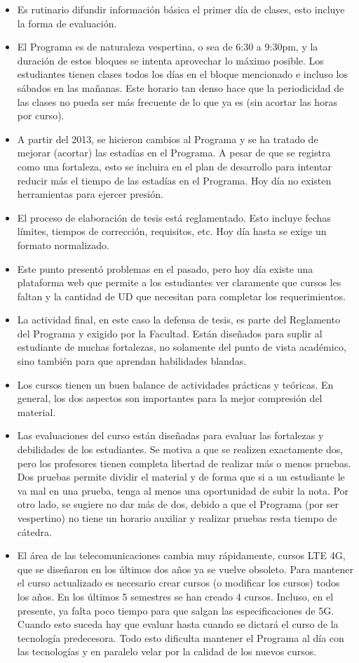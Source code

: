 \begin{itemize}
\item Es rutinario difundir información básica el primer día de clases, esto incluye la forma de evaluación.
\item El Programa es de naturaleza vespertina, o sea de 6:30 a 9:30pm, y la duración de estos bloques se intenta aprovechar 
lo máximo posible. Los estudiantes tienen clases todos los días en el bloque mencionado  e incluso los sábados en las mañanas.
Este horario tan denso hace que la periodicidad de las clases no pueda ser más frecuente de lo que ya es (sin acortar las horas 
por curso).
\item A partir del 2013, se hicieron cambios al Programa y se ha tratado de mejorar (acortar) las estadías en el Programa. A
pesar de que se registra como una fortaleza, esto se incluira en el plan de desarrollo para intentar reducir más el tiempo de 
las estadías en el Programa. Hoy día no existen herramientas para ejercer presión.
\item El proceso de elaboración de tesis está reglamentado. Esto incluye fechas límites, tiempos de corrección, requisitos, etc. 
Hoy día hasta se exige un formato normalizado.
\item Este punto presentó problemas en el pasado, pero hoy día existe una plataforma web que permite a los estudiantes ver claramente
que cursos les faltan y la cantidad de UD que necesitan para completar los requerimientos. 
\item La actividad final, en este caso la defensa de tesis, es parte del Reglamento del Programa y exigido por la Facultad. Están diseñados 
para suplir al estudiante de muchas fortalezas, no solamente del punto de vista académico, sino también para que aprendan habilidades blandas.
\item Los cursos tienen un buen balance de actividades prácticas y teóricas. En general, los dos aspectos son importantes para la mejor
compresión del material.
\item Las evaluaciones del curso están diseñadas para evaluar las fortalezas y debilidades de los estudiantes. Se motiva a que se realizen
exactamente dos, pero los profesores tienen completa libertad de realizar más o menos pruebas. Dos pruebas permite dividir el material 
y de forma que si a un estudiante le va mal en una prueba, tenga al menos una oportunidad de subir la nota. Por otro lado, se sugiere no dar más de dos, 
debido a que el Programa (por ser vespertino) no tiene un horario auxiliar y realizar pruebas resta tiempo de cátedra.
\item El área de las telecomunicaciones cambia muy rápidamente, cursos LTE 4G, que se diseñaron en los últimos dos años ya se vuelve obsoleto.
Para mantener el curso actualizado es necesario crear cursos (o modificar los cursos) todos los años. En los últimos 5 semestres se han 
creado 4 cursos. Incluso, en el presente, ya falta poco tiempo para que salgan las especificaciones de 5G. Cuando esto suceda hay que 
evaluar hasta cuando se dictará el curso de la tecnología predecesora. Todo esto dificulta mantener el Programa al día con las tecnologías y en paralelo velar por la calidad de los nuevos cursos.
\end{itemize}

